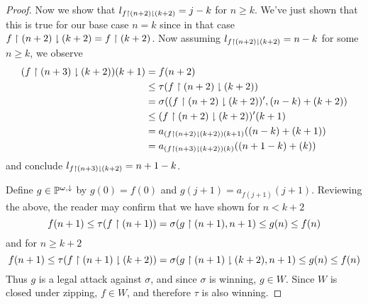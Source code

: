 \documentclass[11pt]{article}
\theoremstyle{plain}
\theoremstyle{definition}
\theoremstyle{remark}
\theoremstyle{plain}
\theoremstyle{definition}
\theoremstyle{remark}
\begin{document}
\begin{proof}
    Now we show that \(l_{f\restriction(n+2)\downharpoonright(k+2)}=j-k\) for \(n\geq k\).
    We've just shown that this is true for our base case \(n=k\)
    since in that case \(f\restriction(n+2)\downharpoonright(k+2)=f\restriction(k+2)\).
    Now assuming \(l_{f\restriction(n+2)\downharpoonright(k+2)}=n-k\) for some \(n\geq k\),
    we observe
    \begin{align*}
      (f\restriction(n+3)\downharpoonright(k+2))(k+1)
        &=
      f(n+2)
        \\&\leq
      \tau(f\restriction(n+2)\downharpoonright(k+2))
        \\&=
      \sigma((f\restriction(n+2)\downharpoonright(k+2))',(n-k)+(k+2))
        \\&\leq
      (f\restriction(n+2)\downharpoonright(k+2))'(k+1)
        \\&=
      a_{(f\restriction(n+2)\downharpoonright(k+2))(k+1)}((n-k)+(k+1))
        \\&=
      a_{(f\restriction(n+3)\downharpoonright(k+2))(k)}((n+1-k)+(k))
    \end{align*}
    and conclude \(l_{f\restriction(n+3)\downharpoonright(k+2)}=n+1-k\).

    Define \(g\in\mathbb{P}^{\omega,\downarrow}\) by \(g(0)=f(0)\) and
    \(g(j+1)=a_{f(j+1)}(j+1)\).
    Reviewing the above, the reader may confirm that we have shown for
    \(n<k+2\)
    \[
      f(n+1)
        \leq
      \tau(f\restriction(n+1))
        =
      \sigma(g\restriction(n+1),n+1)
        \leq
      g(n)
        \leq
      f(n)
    \]
    and for \(n\geq k+2\)
    \[
      f(n+1)
        \leq
      \tau(f\restriction(n+1)\downharpoonright(k+2))
        =
      \sigma(g\restriction(n+1)\downharpoonright(k+2),n+1)
        \leq
      g(n)
        \leq
      f(n)
    \]
    Thus \(g\) is a legal attack against \(\sigma\), and since \(\sigma\)
    is winning, \(g\in W\). Since \(W\) is closed under zipping,
    \(f\in W\), and therefore \(\tau\) is also winning.
  \end{proof}

  
  
\end{document}
